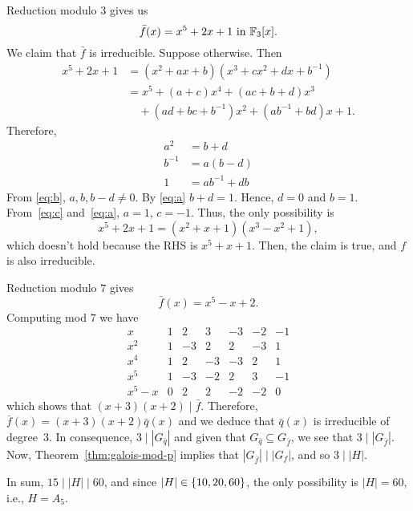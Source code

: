 \begin{solution}
\begin{description}
        Reduction modulo $3$ gives us
        $$
            \bar f(x) = x^5+2x+1\text{ in }\mathbb F_3[x].
        $$
        We claim that $\bar f$ is irreducible. Suppose otherwise. Then
        \begin{align*}
            x^5+2x+1 &= (x^2+ax+b)(x^3+cx^2+dx+b^{-1})\\
                &= x^5+(a+c)x^4+(ac+b+d)x^3\\
                &\quad+(ad+bc+b^{-1})x^2+(ab^{-1}+bd)x+1.
        \end{align*}
        Therefore,
        \begin{align}
            a^2 &= b+d\label{eq:a}\\
            b^{-1} &= a(b-d)\label{eq:b}\\
            1 &= ab^{-1}+db\label{eq:c}
        \end{align}
        From \eqref{eq:b}, $a,b,b-d\ne0$. By \eqref{eq:a} $b+d=1$. Hence, $d=0$ and $b=1$. From~\eqref{eq:c} and~\eqref{eq:a}, $a=1$, $c=-1$. Thus, the only possibility is
        $$
            x^5+2x+1 = (x^2+x+1)(x^3-x^2+1),
        $$
        which doesn't hold because the RHS is $x^5+x+1$. Then, the claim is true, and $f$ is also irreducible.

        Reduction modulo $7$ gives
        $$
            \bar f(x) = x^5-x+2.
        $$
        Computing mod $7$ we have
        $$
            \begin{array}{l|rrrrrr}
                 x& 1&2&3&-3&-2&-1\\
                 x^2&1&-3&2&2&-3&1\\
                 x^4&1&2&-3&-3&2&1\\
                 x^5&1&-3&-2&2&3&-1\\
                 x^5-x&0&2&2&-2&-2&0
            \end{array}
        $$
        which shows that $(x+3)(x+2)\mid\bar f$. Therefore, $\bar f(x)=(x+3)(x+2)\bar q(x)$ and we deduce that $\bar q(x)$ is irreducible of degree~$3$. In consequence, $3\mid|G_{\bar q}|$ and given that $G_{\bar q}\subseteq G_{\bar f}$, we see that $3\mid|G_{\bar f}|$. Now, Theorem~\ref{thm:galois-mod-p} implies that $|G_{\bar f}|\mid |G_f|$, and so $3\mid|H|$.

        In sum, $15\mid |H|\mid60$, and since $|H|\in\{10,20,60\}$, the only possibility is $|H|=60$, i.e., $H=A_5$.
        

\end{description}
\end{solution}

